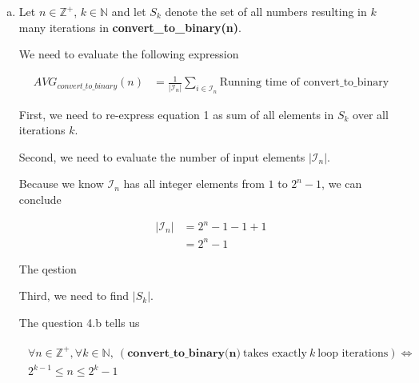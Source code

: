 \documentclass[12pt]{article}
\begin{document}
\begin{enumerate}[a.]
\begin{mdframed}
    \end{mdframed}

    \item

    Let $n \in \mathbb{Z}^+$, $k \in \mathbb{N}$ and let $S_k$ denote the set
    of all numbers resulting in $k$ many iterations in \textbf{convert\_to\_binary(n)}.

    \bigskip

    We need to evaluate the following expression

    \setcounter{equation}{0}
    \begin{align}
        AVG_{convert\_to\_binary}(n) &= \frac{1}{\lvert \mathcal{I}_n \rvert} \sum\limits_{i \in \mathcal{I}_n} \text{Running time of convert\_to\_binary}
    \end{align}

    \bigskip

    First, we need to re-express equation 1 as sum of all elements in $S_k$
    over all iterations $k$.

    \bigskip



    \bigskip

    Second, we need to evaluate the number of input elements $\lvert \mathcal{I}_n \rvert$.

    \bigskip

    Because we know $\mathcal{I}_n$ has all integer elements from $1$ to $2^n - 1$,
    we can conclude

    \begin{align}
        \lvert \mathcal{I}_n \rvert &= 2^n - 1 - 1 + 1\\
        &= 2^n - 1
    \end{align}

    \bigskip

    The qestion

    \bigskip

    Third, we need to find $\lvert S_k \rvert$.

    \bigskip

    The question 4.b tells us

    \begin{align}
        \begin{split}
        \forall n \in \mathbb{Z}^+, \forall k \in \mathbb{N},\: (\textbf{
        convert\_to\_binary(n)}\:\text{takes exactly}\:k\:\text{loop iterations}) \Leftrightarrow
        \\ 2^{k-1} \leq n \leq 2^k -1
        \end{split}
    \end{align}


\end{enumerate}
\end{document}
